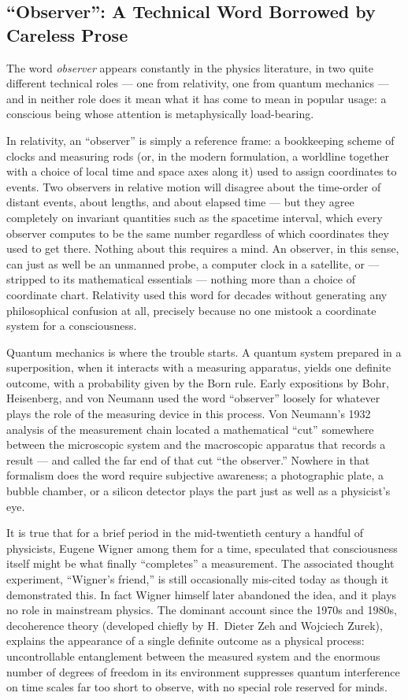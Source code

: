 \subsection{``Observer'': A Technical Word Borrowed by Careless Prose}

The word \emph{observer} appears constantly in the physics literature, in
two quite different technical roles --- one from relativity, one from
quantum mechanics --- and in neither role does it mean what it has come to
mean in popular usage: a conscious being whose attention is metaphysically
load-bearing.

In relativity, an ``observer'' is simply a reference frame: a bookkeeping
scheme of clocks and measuring rods (or, in the modern formulation, a
worldline together with a choice of local time and space axes along it)
used to assign coordinates to events. Two observers in relative motion will
disagree about the time-order of distant events, about lengths, and about
elapsed time --- but they agree completely on invariant quantities such as
the spacetime interval,
which every observer computes to be the same number regardless of which
coordinates they used to get there. Nothing about this requires a mind.
An observer, in this sense, can just as well be an unmanned probe, a
computer clock in a satellite, or --- stripped to its mathematical
essentials --- nothing more than a choice of coordinate chart. Relativity
used this word for decades without generating any philosophical confusion
at all, precisely because no one mistook a coordinate system for a
consciousness.

Quantum mechanics is where the trouble starts. A quantum system prepared in
a superposition, when it interacts with a measuring apparatus, yields one
definite outcome, with a probability given by the Born rule.
Early expositions by Bohr, Heisenberg, and von Neumann used the word
``observer'' loosely for whatever plays the role of the measuring device in
this process. Von Neumann's 1932 analysis of the measurement chain located
a mathematical ``cut'' somewhere between the microscopic system and the
macroscopic apparatus that records a result --- and called the far end of
that cut ``the observer.'' Nowhere in that formalism does the word require
subjective awareness; a photographic plate, a bubble chamber, or a silicon
detector plays the part just as well as a physicist's eye.

It is true that for a brief period in the mid-twentieth century a handful of
physicists, Eugene Wigner among them for a time, speculated that
consciousness itself might be what finally ``completes'' a measurement.
The associated thought experiment, ``Wigner's friend,'' is still
occasionally mis-cited today as though it demonstrated this. In fact Wigner
himself later abandoned the idea, and it plays no role in mainstream
physics. The dominant account since the 1970s and 1980s, decoherence
theory (developed chiefly by H.\ Dieter Zeh and Wojciech Zurek), explains
the appearance of a single definite outcome as a physical process:
uncontrollable entanglement between the measured system and the enormous
number of degrees of freedom in its environment suppresses quantum
interference on time scales far too short to observe, with no special
role reserved for minds.

